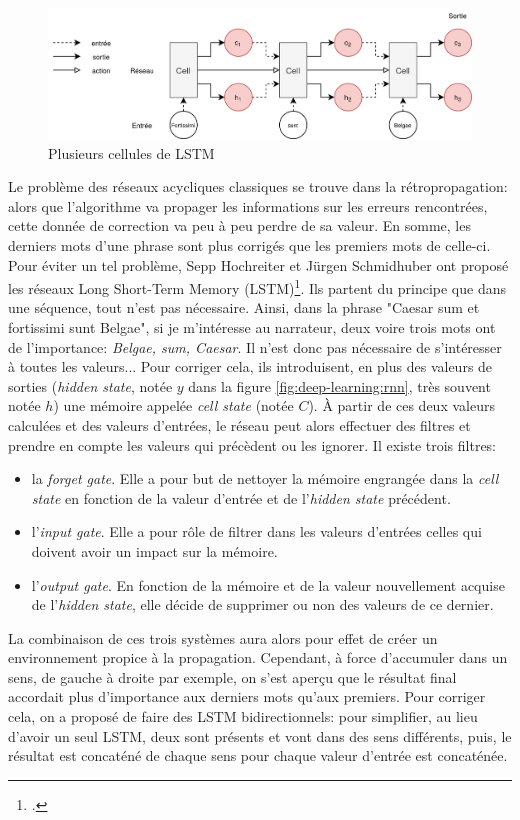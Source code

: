 \begin{figure}[h]
    \centering
    \includegraphics[width=\linewidth]{results/deep-learning/explanations/LSTM-Zoom-Out.png}
    \caption{Plusieurs cellules de LSTM}
    \label{fig:deep-learning:lstm}
\end{figure}

Le problème des réseaux acycliques classiques se trouve dans la rétropropagation: alors que l'algorithme va propager les informations sur les erreurs rencontrées, cette donnée de correction va peu à peu perdre de sa valeur. En somme, les derniers mots d'une phrase sont plus corrigés que les premiers mots de celle-ci. Pour éviter un tel problème, Sepp Hochreiter et Jürgen Schmidhuber ont proposé les réseaux Long Short-Term Memory (LSTM)\footcite{hochreiter_long_1997}. Ils partent du principe que dans une séquence, tout n'est pas nécessaire. Ainsi, dans la phrase "Caesar sum et fortissimi sunt Belgae", si je m'intéresse au narrateur, deux voire trois mots ont de l'importance: \textit{Belgae, sum, Caesar}. Il n'est donc pas nécessaire de s'intéresser à toutes les valeurs... Pour corriger cela, ils introduisent, en plus des valeurs de sorties (\textit{hidden state}, notée $y$ dans la figure \ref{fig:deep-learning:rnn}, très souvent notée $h$) une mémoire appelée \textit{cell state} (notée $C$). À partir de ces deux valeurs calculées et des valeurs d'entrées, le réseau peut alors effectuer des filtres et prendre en compte les valeurs qui précèdent ou les ignorer. Il existe trois filtres:
\begin{itemize}
    \item la \textit{forget gate}. Elle a pour but de nettoyer la mémoire engrangée dans la \textit{cell state} en fonction de la valeur d'entrée et de l'\textit{hidden state} précédent. 
    \item l'\textit{input gate}. Elle a pour rôle de filtrer dans les valeurs d'entrées celles qui doivent avoir un impact sur la mémoire.
    \item l'\textit{output gate}. En fonction de la mémoire et de la valeur nouvellement acquise de l'\textit{hidden state}, elle décide de supprimer ou non des valeurs de ce dernier.
\end{itemize}
La combinaison de ces trois systèmes aura alors pour effet de créer un environnement propice à la propagation. Cependant, à force d'accumuler dans un sens, de gauche à droite par exemple, on s'est aperçu que le résultat final accordait plus d'importance aux derniers mots qu'aux premiers. Pour corriger cela, on a proposé de faire des LSTM bidirectionnels: pour simplifier, au lieu d'avoir un seul LSTM, deux sont présents et vont dans des sens différents, puis, le résultat est concaténé de chaque sens pour chaque valeur d'entrée est concaténée.


